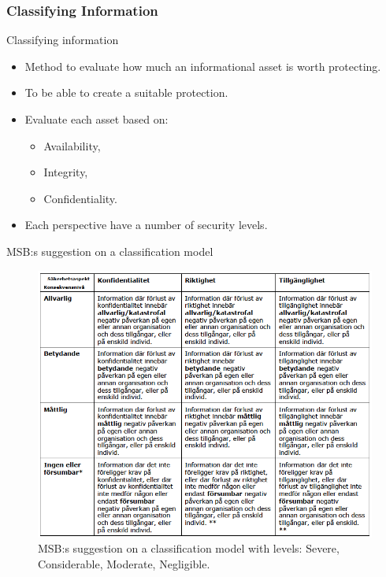 \documentclass{beamer}
\begin{document}
\subsubsection{Classifying Information}
\begin{frame}{Classifying information}
  \begin{itemize}
    \item Method to evaluate how much an informational asset is worth
      protecting.

    \item To be able to create a suitable protection.

    \item Evaluate each asset based on:
      \begin{itemize}
        \item Availability,
        \item Integrity,
        \item Confidentiality.
      \end{itemize}

    \item Each perspective have a number of security levels.

  \end{itemize}
\end{frame}

\begin{frame}{MSB:s suggestion on a classification model}
  \begin{figure}
    \includegraphics[height=0.7\textheight]{Figures/msb-klassificering.png}
    \caption{MSB:s suggestion on a classification model with levels: Severe, Considerable,
      Moderate, Negligible.}
  \end{figure}
\end{frame}
\end{document}
